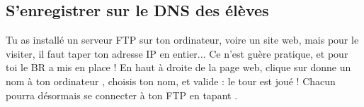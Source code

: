 \subsection{S'enregistrer sur le DNS des élèves}
\label{dnsapp}

Tu as install\'e un serveur FTP sur ton ordinateur, voire un site web, mais pour le visiter, il faut taper ton adresse IP en entier...
Ce n'est gu\`ere pratique, et pour toi le BR a mis en place  !
En haut \`a droite de la page web, clique sur \og donne un nom \`a ton ordinateur \fg, choisis ton nom, et valide : le tour est jou\'e ! Chacun pourra d\'esormais se connecter \`a ton FTP en tapant .
